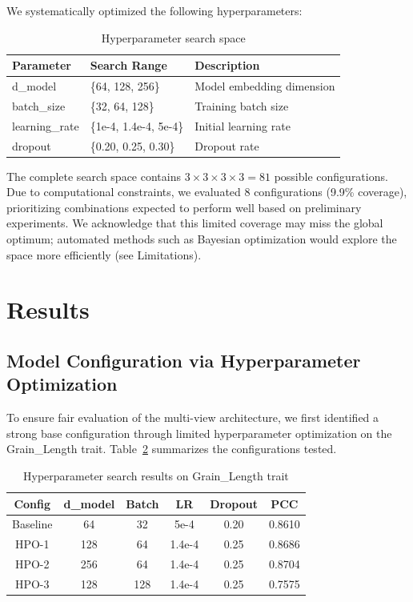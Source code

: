 \documentclass[11pt,a4paper]{article}
\begin{document}
We systematically optimized the following hyperparameters:

\begin{table}[H]
\centering
\caption{Hyperparameter search space}
\label{tab:hpo_space}
\begin{tabular}{lll}
\toprule
\textbf{Parameter} & \textbf{Search Range} & \textbf{Description} \\
\midrule
d\_model & \{64, 128, 256\} & Model embedding dimension \\
batch\_size & \{32, 64, 128\} & Training batch size \\
learning\_rate & \{1e-4, 1.4e-4, 5e-4\} & Initial learning rate \\
dropout & \{0.20, 0.25, 0.30\} & Dropout rate \\
\bottomrule
\end{tabular}
\end{table}

The complete search space contains $3 \times 3 \times 3 \times 3 = 81$ possible configurations. Due to computational constraints, we evaluated 8 configurations (9.9\% coverage), prioritizing combinations expected to perform well based on preliminary experiments. We acknowledge that this limited coverage may miss the global optimum; automated methods such as Bayesian optimization would explore the space more efficiently (see Limitations).

\section{Results}
\label{sec:results}

\subsection{Model Configuration via Hyperparameter Optimization}
\label{subsec:hpo_results}

To ensure fair evaluation of the multi-view architecture, we first identified a strong base configuration through limited hyperparameter optimization on the Grain\_Length trait. Table~\ref{tab:hpo_results} summarizes the configurations tested.

\begin{table}[H]
\centering
\caption{Hyperparameter search results on Grain\_Length trait}
\label{tab:hpo_results}
\begin{tabular}{cccccc}
\toprule
\textbf{Config} & \textbf{d\_model} & \textbf{Batch} & \textbf{LR} & \textbf{Dropout} & \textbf{PCC} \\
\midrule
Baseline & 64 & 32 & 5e-4 & 0.20 & 0.8610 \\
HPO-1 & 128 & 64 & 1.4e-4 & 0.25 & 0.8686 \\
HPO-2 & 256 & 64 & 1.4e-4 & 0.25 & 0.8704 \\
HPO-3 & 128 & 128 & 1.4e-4 & 0.25 & 0.7575 \\
\bottomrule
\end{tabular}
\end{table}
\end{document}
